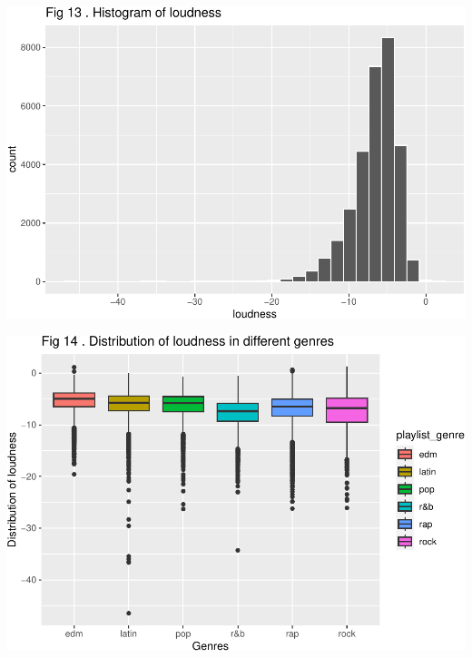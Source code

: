 \documentclass[
]{article}
\begin{document}
\includegraphics{Final-Report_files/figure-latex/unnamed-chunk-14-9.pdf}

\includegraphics{Final-Report_files/figure-latex/unnamed-chunk-14-10.pdf}
\end{document}
